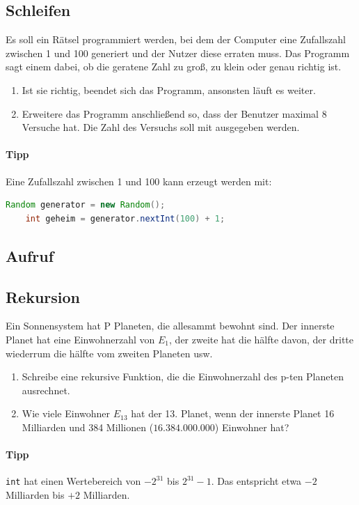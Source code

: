 \documentclass[11pt, a4paper]{article}
\begin{document}
\subsection{Schleifen}
Es soll ein Rätsel programmiert werden, bei dem der Computer eine Zufallszahl zwischen 1 und 100 generiert und der Nutzer diese erraten muss. Das Programm sagt einem dabei, ob die geratene Zahl zu groß, zu klein oder genau richtig ist.
\begin{enumerate}
	\item Ist sie richtig, beendet sich das Programm, ansonsten läuft es weiter.
	\item Erweitere das Programm anschließend so, dass der Benutzer maximal 8 Versuche hat. Die Zahl des Versuchs soll mit ausgegeben werden.
\end{enumerate}
\paragraph{Tipp} Eine Zufallszahl zwischen 1 und 100 kann erzeugt werden mit:
\begin{lstlisting}[language=Java]
	Random generator = new Random();
	int geheim = generator.nextInt(100) + 1;
\end{lstlisting}





\subsection{Aufruf}

\subsection{Rekursion}
Ein Sonnensystem hat P Planeten, die allesammt bewohnt sind. Der innerste Planet hat eine Einwohnerzahl von $E_1$, der zweite hat die hälfte davon, der dritte wiederrum die hälfte vom zweiten Planeten usw.
\begin{enumerate}
	\item Schreibe eine rekursive Funktion, die die Einwohnerzahl des p-ten Planeten ausrechnet.
	\item Wie viele Einwohner $E_{13}$ hat der 13. Planet, wenn der innerste Planet 16 Milliarden und 384 Millionen ($16.384.000.000$) Einwohner hat?
\end{enumerate}
\paragraph{Tipp} \texttt{int} hat einen Wertebereich von $-2^{31}$ bis $2^{31}-1$. Das entspricht etwa $-2$ Milliarden bis $+2$ Milliarden.
\end{document}
